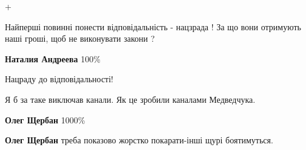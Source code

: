 \begin{itemize}
\begin{itemize}
+
\end{itemize}

 

Найперші повинні понести відповідальність - нацзрада ! За що вони отримують
наші гроші, щоб не виконувати закони ?

\begin{itemize}

 
\textbf{Наталия Андреева} 100\%

 
Нацраду до відповідальності!
\end{itemize}

 
Я б за таке виключав канали. Як це зробили каналами Медведчука.

\begin{itemize}

 
\textbf{Олег Щербан} 1000\%

 
\textbf{Олег Щербан} треба показово жорстко покарати-інші щурі боятимуться.

 

\end{itemize}
\end{itemize}
